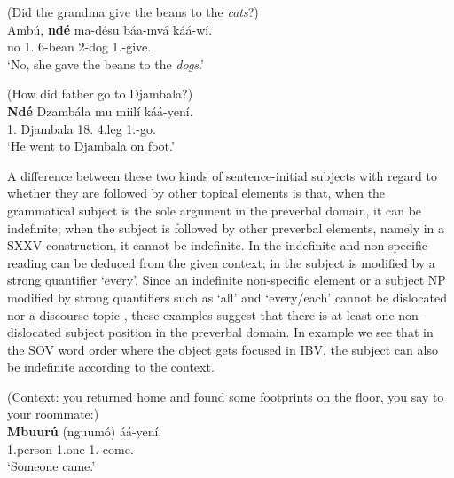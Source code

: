 \documentclass[output=paper,colorlinks,citecolor=brown,
]{langscibook}
\begin{document}
\begin{exe}
\ex
\label{90}
 (Did the grandma give the beans to the \textit{cats}?)\\
\gll
Ambú, \textbf{ndé} ma-désu báa-mvá káá-wí.\\
no 1.\Pro{} 6-bean 2-dog 1\Sm{}.\Pst{}-give.\Pst{}\\
\trans ‘No, she gave the beans to the \textit{dogs}.’

\end{exe}
\begin{exe}
\ex
\label{91}
 (How did father go to Djambala?) \\
\gll
\textbf{Ndé} Dzambála mu miilí káá-yení.\\
1.\Pro{} Djambala 18.\Loc{} 4.leg 1\Sm{}.\Pst{}-go.\Pst{}\\
\trans ‘He went to Djambala on foot.’

\end{exe}
A difference between these two kinds of sentence-initial subjects with regard to whether they are followed by other topical elements is that, when the grammatical subject is the sole argument in the preverbal domain, it can be indefinite; when the subject is followed by other preverbal elements, namely in a SXXV construction, it cannot be indefinite. In  the indefinite and non-specific reading can be deduced from the given context; in  the subject is modified by a strong quantifier `every'. Since an indefinite non-specific element or a subject NP modified by strong quantifiers such as `all' and `every/each' cannot be dislocated nor a discourse topic \citep{Rizzi1986, Zerbian2006, Zeller2008, vanderWal2009a}, these examples suggest that there is at least one non-dislocated subject position in the preverbal domain. In example  we see that in the SOV word order where the object gets focused in IBV, the subject can also be indefinite according to the context.
\begin{exe}
\ex
\label{92}
 (Context: you returned home and found some footprints on the floor, you say to your roommate:) \\
\gll
\textbf{Mbuurú} (nguumó) áá-yení.\\
1.person {\db}1.one 1\Sm{}.\Pst{}-come.\Pst{}\\
\trans ‘Someone came.’ 

\end{exe}
\end{document}
